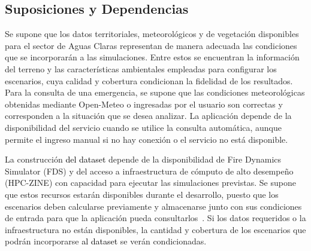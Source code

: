 \subsection{Suposiciones y Dependencias}{\color{black}
Se supone que los datos territoriales, meteorológicos y de vegetación disponibles para el sector de Aguas Claras representan de manera adecuada las condiciones que se incorporarán a las simulaciones. Entre estos se encuentran la información del terreno y las características ambientales empleadas para configurar los escenarios, cuya calidad y cobertura condicionan la fidelidad de los resultados. Para la consulta de una emergencia, se supone que las condiciones meteorológicas obtenidas mediante Open-Meteo o ingresadas por el usuario son correctas y corresponden a la situación que se desea analizar. La aplicación depende de la disponibilidad del servicio cuando se utilice la consulta automática, aunque permite el ingreso manual si no hay conexión o el servicio no está disponible.

La construcción \textcolor{black}{del dataset} depende de la disponibilidad de Fire Dynamics Simulator (FDS) y del acceso a infraestructura de cómputo de alto desempeño (HPC-ZINE) con capacidad para ejecutar las simulaciones previstas. Se supone que estos recursos estarán disponibles durante el desarrollo, puesto que los escenarios deben calcularse previamente y almacenarse junto con sus condiciones de entrada para que la aplicación pueda consultarlos~\cite{vfp2026}. Si los datos requeridos o la infraestructura no están disponibles, la cantidad y cobertura de los escenarios que podrán incorporarse \textcolor{black}{al dataset} se verán condicionadas.
}
